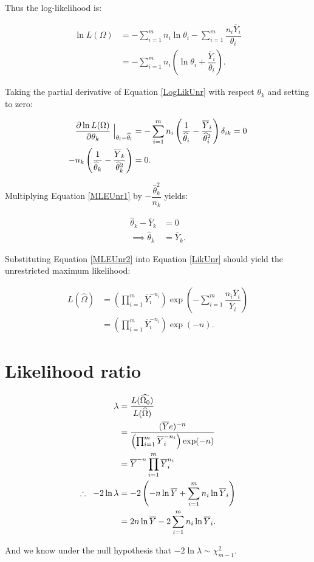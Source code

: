 \documentclass[12pt,a4paper,openright]{article}
\newcommand{\eqn}[1]{Equation \ref{#1}}
\newcommand{\ovY}{\overline{Y}}
\newcommand{\wth}{\widehat{\theta}}
\begin{document}
    Thus the log-likelihood is:

    \begin{align}
        \ln{L(\Omega)} &= -\sum_{i=1}^m n_i \ln{\theta_i} - \sum_{i=1}^m \dfrac{n_i\ovY_i}{\theta_i} \\
        &= -\sum_{i=1}^m n_i\left(\ln{\theta_i} + \dfrac{\ovY_i}{\theta_i}\right). \label{LogLikUnr}
    \end{align}

    Taking the partial derivative of \eqn{LogLikUnr} with respect $\theta_k$ and setting to zero:

    \begin{align}
        \dfrac{\partial \ln{L(\Omega)}}{\partial \theta_k} \Bigm\lvert_{\theta_l = \wth_l} &= -\sum_{i=1}^m n_i\left(\dfrac{1}{\wth_i} - \dfrac{\ovY_i}{\wth_i^2}\right) \delta_{ik} = 0 \nonumber\\
        -n_k\left(\dfrac{1}{\wth_k}-\dfrac{\ovY_k}{\wth_k^2}\right) &= 0. \label{MLEUnr1}
    \end{align}

    Multiplying \eqn{MLEUnr1} by $-\dfrac{\wth_k^2}{n_k}$ yields:

    \begin{align}
        \wth_k - \ovY_k &= 0 \nonumber\\
        \implies \wth_k &= \ovY_k. \label{MLEUnr2}
    \end{align}

    Substituting \eqn{MLEUnr2} into \eqn{LikUnr} should yield the unrestricted maximum likelihood:

    \begin{align}
        L(\widehat{\Omega}) &= \left(\prod_{i=1}^m \ovY_i^{-n_i}\right) \exp\left(-\sum_{i=1}^m \dfrac{n_i\ovY_i}{\ovY_i}\right) \nonumber \\
        &= \left(\prod_{i=1}^m \ovY_i^{-n_i}\right)\exp(-n). \label{MLUnr}
    \end{align}

    \section{Likelihood ratio}
    \begin{align}
        \lambda &= \dfrac{L(\widehat{\Omega_0})}{L(\widehat{\Omega})} \nonumber \\
        &= \dfrac{(\ovY e)^{-n}}{\left(\prod_{i=1}^m \ovY_i^{-n_i}\right)\exp(-n)} \nonumber\\
        &= \ovY^{-n} \prod_{i=1}^m \ovY_i^{n_i} \nonumber \\
        \therefore \hspace{0.2cm} -2\ln{\lambda} &= -2 \left(-n\ln{\ovY} + \sum_{i=1}^m n_i \ln{\ovY_i}\right) \nonumber\\
        &= 2n\ln{\ovY} - 2\sum_{i=1}^{m} n_i \ln{\ovY_i}. \label{testSt} 
    \end{align}

    And we know under the null hypothesis that $-2\ln{\lambda} \sim \chi^2_{m-1}$. 
\end{document}
